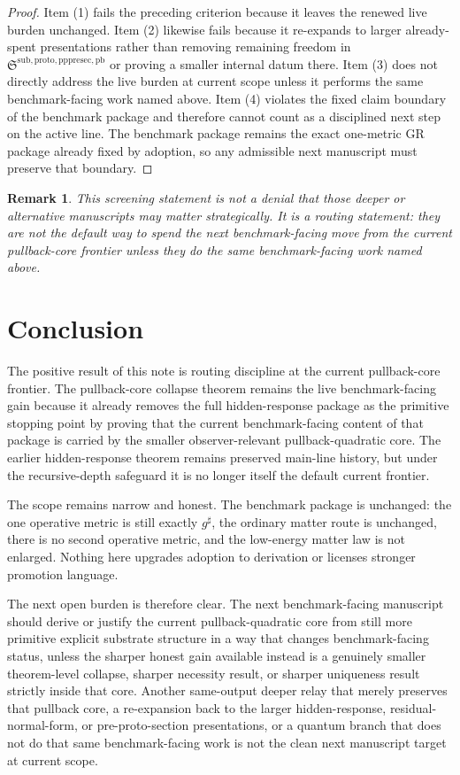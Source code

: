 \documentclass[11pt]{article}
\newcommand{\CompletedMetric}{g^{\sharp}}
\newcommand{\PrePreProtoSectionPullbackCore}{\mathfrak S^{\mathrm{sub,proto,pppresec,pb}}}
\newtheorem{remark}{Remark}
\begin{document}
\begin{proof}
Item (1) fails the preceding criterion because it leaves the renewed live burden unchanged. Item (2) likewise fails because it re-expands to larger already-spent presentations rather than removing remaining freedom in \(\PrePreProtoSectionPullbackCore\) or proving a smaller internal datum there. Item (3) does not directly address the live burden at current scope unless it performs the same benchmark-facing work named above. Item (4) violates the fixed claim boundary of the benchmark package and therefore cannot count as a disciplined next step on the active line. The benchmark package remains the exact one-metric GR package already fixed by adoption, so any admissible next manuscript must preserve that boundary.
\end{proof}

\begin{remark}
This screening statement is not a denial that those deeper or alternative manuscripts may matter strategically. It is a routing statement: they are not the default way to spend the next benchmark-facing move from the current pullback-core frontier unless they do the same benchmark-facing work named above.
\end{remark}

\section{Conclusion}

The positive result of this note is routing discipline at the current pullback-core frontier. The pullback-core collapse theorem remains the live benchmark-facing gain because it already removes the full hidden-response package as the primitive stopping point by proving that the current benchmark-facing content of that package is carried by the smaller observer-relevant pullback-quadratic core. The earlier hidden-response theorem remains preserved main-line history, but under the recursive-depth safeguard it is no longer itself the default current frontier.

The scope remains narrow and honest. The benchmark package is unchanged: the one operative metric is still exactly \(\CompletedMetric\), the ordinary matter route is unchanged, there is no second operative metric, and the low-energy matter law is not enlarged. Nothing here upgrades adoption to derivation or licenses stronger promotion language.

The next open burden is therefore clear. The next benchmark-facing manuscript should derive or justify the current pullback-quadratic core from still more primitive explicit substrate structure in a way that changes benchmark-facing status, unless the sharper honest gain available instead is a genuinely smaller theorem-level collapse, sharper necessity result, or sharper uniqueness result strictly inside that core. Another same-output deeper relay that merely preserves that pullback core, a re-expansion back to the larger hidden-response, residual-normal-form, or pre-proto-section presentations, or a quantum branch that does not do that same benchmark-facing work is not the clean next manuscript target at current scope.
\end{document}
